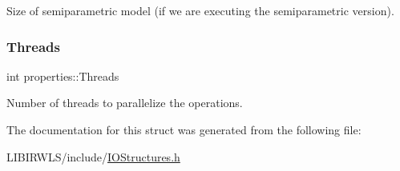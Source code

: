 Size of semiparametric model (if we are executing the semiparametric version). \hypertarget{structproperties_a56ab77c44fb808e71990074bd75529ed}{}\label{structproperties_a56ab77c44fb808e71990074bd75529ed} 
\subsubsection{\texorpdfstring{Threads}{Threads}}
{\ttfamily int properties\+::\+Threads}

Number of threads to parallelize the operations. 

The documentation for this struct was generated from the following file\+:\begin{DoxyCompactItemize}
\item 
L\+I\+B\+I\+R\+W\+L\+S/include/\hyperlink{IOStructures_8h}{I\+O\+Structures.\+h}\end{DoxyCompactItemize}
